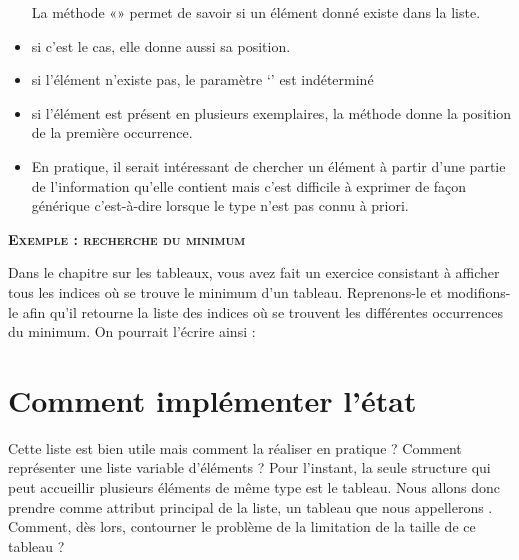 \begin{itemize}
		La méthode «» permet de savoir si un élément
		donné existe dans la liste. 
	\item 
		si c’est le cas, elle donne aussi sa position.
	\item 
		si l’élément n’existe pas, le paramètre ‘’ est
		indéterminé 
	\item 
		si l’élément est présent en plusieurs exemplaires, la méthode donne la
		position de la première occurrence.
	\item 
		En pratique, il serait intéressant de chercher un élément à partir d’une
		partie de l’information qu’elle contient mais c’est difficile à
		exprimer de façon générique c'est-à-dire lorsque le
		type n'est pas connu à priori.
\end{itemize}

\bigskip

{\sffamily\bfseries\scshape
Exemple : recherche du minimum}

Dans le chapitre sur les tableaux, vous avez fait un exercice consistant
à afficher tous les indices où se trouve le minimum d’un tableau.
Reprenons-le et modifions-le afin qu’il retourne la liste des indices
où se trouvent les différentes occurrences du minimum. On pourrait
l’écrire ainsi :


\bigskip

\section{Comment implémenter l’état}

Cette liste est bien utile mais comment la réaliser en pratique ?
Comment représenter une liste variable d’éléments ? Pour
l'instant, la seule structure qui peut accueillir
plusieurs éléments de même type est le tableau. Nous allons donc
prendre comme attribut principal de la liste, un tableau que nous
appellerons . Comment, dès lors, contourner
le problème de la limitation de la taille de ce tableau ?

